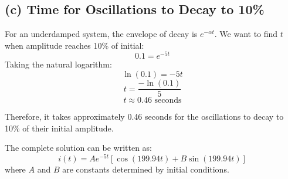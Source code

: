 \documentclass[12pt]{article}
\begin{document}
	\subsection*{(c) Time for Oscillations to Decay to 10\%}
	For an underdamped system, the envelope of decay is $e^{-\alpha t}$.
	We want to find $t$ when amplitude reaches 10\% of initial:
	\begin{equation}
		0.1 = e^{-5t}
	\end{equation}
	Taking the natural logarithm:
	\begin{equation}
		\ln(0.1) = -5t
	\end{equation}
	\begin{equation}
		t = \frac{-\ln(0.1)}{5}
	\end{equation}
	\begin{equation}
		t \approx 0.46 \text{ seconds}
	\end{equation}
	
	Therefore, it takes approximately 0.46 seconds for the oscillations to decay to 10\% of their initial amplitude.
	
	The complete solution can be written as:
	\begin{equation}
		i(t) = A e^{-5t} \left[ \cos(199.94t) + B \sin(199.94t) \right]
	\end{equation}
	where $A$ and $B$ are constants determined by initial conditions.
	
	
	
	
	
	
	
\end{document}

